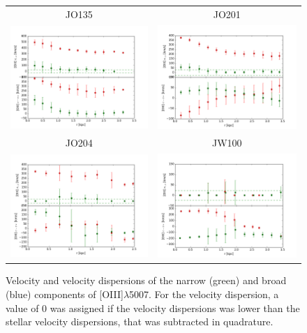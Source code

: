 \documentclass[fleqn,usenatbib]{mnras}
\begin{document}
\begin{figure}
	\begin{tabular}{cc}
		JO135 & JO201\\
		\includegraphics[width=.5\linewidth]{Plots/JO135_vvd2.png}& 
		\includegraphics[width=.5\linewidth]{Plots/JO201_vvd2.png}\\
		JO204 & JW100\\
		\includegraphics[width=.5\linewidth]{Plots/JO204_vvd2.png} &
		\includegraphics[width=.5\linewidth]{Plots/JW100_vvd2.png}\\
	\end{tabular} 
	\caption{Velocity and velocity dispersions of the narrow (green) and broad (blue)
		components of [OIII]$\lambda$5007. For the velocity dispersion, a value of 0 was assigned if the velocity dispersions was lower than the stellar velocity dispersions, that was subtracted in quadrature.\label{fig:vvd}}
\end{figure}
\end{document}
